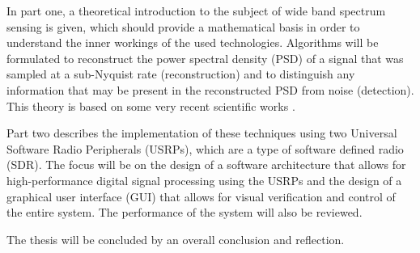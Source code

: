 \documentclass[a4paper, openany, oneside]{memoir}
\begin{document}
In part one, a theoretical introduction to the subject of wide band spectrum sensing is given, which should provide a mathematical basis in order to understand the inner workings of the used technologies. Algorithms will be formulated to reconstruct the power spectral density (PSD) of a signal that was sampled at a sub-Nyquist rate (reconstruction) and to distinguish any information that may be present in the reconstructed PSD from noise (detection). This theory is based on some very recent scientific works \cite{ariananda2011multicoset, ariananda2012compressive}.

Part two describes the implementation of these techniques using two Universal Software Radio Peripherals (USRPs), which are a type of software defined radio (SDR). The focus will be on the design of a software architecture that allows for high-performance digital signal processing using the USRPs and the design of a graphical user interface (GUI) that allows for visual verification and control of the entire system. The performance of the system will also be reviewed.

The thesis will be concluded by an overall conclusion and reflection.
\end{document}
